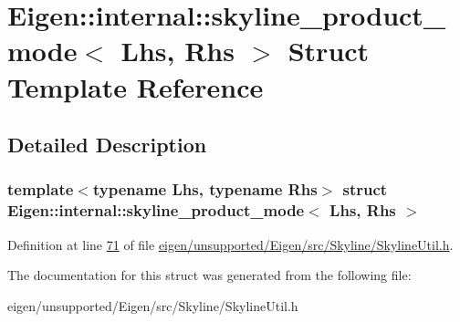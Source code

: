 \hypertarget{struct_eigen_1_1internal_1_1skyline__product__mode}{}\section{Eigen\+:\+:internal\+:\+:skyline\+\_\+product\+\_\+mode$<$ Lhs, Rhs $>$ Struct Template Reference}
\label{struct_eigen_1_1internal_1_1skyline__product__mode}


\subsection{Detailed Description}
\subsubsection*{template$<$typename Lhs, typename Rhs$>$\newline
struct Eigen\+::internal\+::skyline\+\_\+product\+\_\+mode$<$ Lhs, Rhs $>$}



Definition at line \hyperlink{eigen_2unsupported_2_eigen_2src_2_skyline_2_skyline_util_8h_source_l00071}{71} of file \hyperlink{eigen_2unsupported_2_eigen_2src_2_skyline_2_skyline_util_8h_source}{eigen/unsupported/\+Eigen/src/\+Skyline/\+Skyline\+Util.\+h}.



The documentation for this struct was generated from the following file\+:\begin{DoxyCompactItemize}
\item 
eigen/unsupported/\+Eigen/src/\+Skyline/\+Skyline\+Util.\+h\end{DoxyCompactItemize}
